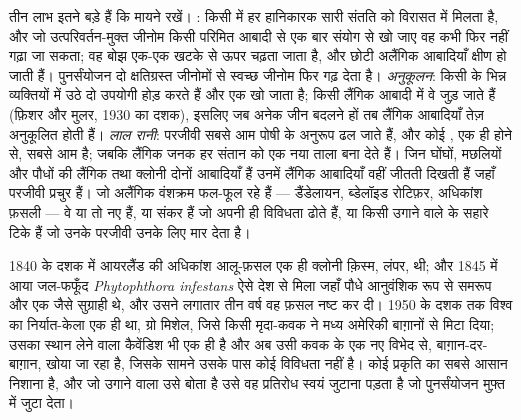 \begin{proposition}[लैंगिकता किसलिए है]\label{prop:b2:asexual-reproduction:whysex}
तीन लाभ इतने बड़े हैं कि मायने रखें। \emph{}:
किसी  में हर हानिकारक  सारी संतति को विरासत में मिलता
है, और जो उत्परिवर्तन-मुक्त जीनोम किसी परिमित आबादी से एक बार संयोग से
खो जाए वह कभी फिर नहीं गढ़ा जा सकता; वह बोझ एक-एक खटके से ऊपर चढ़ता जाता
है, और छोटी अलैंगिक आबादियाँ क्षीण हो जाती हैं। पुनर्संयोजन दो
क्षतिग्रस्त जीनोमों से स्वच्छ जीनोम फिर गढ़ देता है। \emph{अनुकूलन}: किसी
 के भिन्न व्यक्तियों में उठे दो उपयोगी  होड़ करते हैं और
एक खो जाता है; किसी लैंगिक आबादी में वे जुड़ जाते हैं (फ़िशर और मुलर,
1930 का दशक), इसलिए जब अनेक जीन बदलने हों तब लैंगिक आबादियाँ तेज़
अनुकूलित होती हैं। \emph{लाल रानी}: परजीवी सबसे आम पोषी
 के अनुरूप ढल जाते हैं, और कोई , एक ही  होने से,
सबसे आम है; जबकि लैंगिक जनक हर संतान को एक नया ताला बना देते हैं। जिन
घोंघों, मछलियों और पौधों की लैंगिक तथा क्लोनी दोनों आबादियाँ हैं उनमें
लैंगिक आबादियाँ वहीं जीतती दिखती हैं जहाँ परजीवी प्रचुर हैं। जो अलैंगिक
वंशक्रम फल-फूल रहे हैं --- डैंडेलायन, ब्डेलॉइड रोटिफ़र, अधिकांश फ़सली
 --- वे या तो नए हैं, या  संकर हैं जो अपनी ही
विविधता ढोते हैं, या किसी उगाने वाले के सहारे टिके हैं जो उनके परजीवी
उनके लिए मार देता है।
\end{proposition}

\begin{example}[किसी क्लोन के एकशस्य]\label{ex:b2:asexual-reproduction:monoculture}
1840 के दशक में आयरलैंड की अधिकांश आलू-फ़सल एक ही क्लोनी
क़िस्म, लंपर, थी; और 1845 में आया जल-फफूँद \emph{Phytophthora infestans}
ऐसे देश से मिला जहाँ पौधे आनुवंशिक रूप से समरूप और एक जैसे
सुग्राही थे, और उसने लगातार तीन वर्ष वह फ़सल नष्ट कर दी।
1950 के दशक तक विश्व का निर्यात-केला एक ही  था, ग्रो
मिशेल, जिसे किसी मृदा-कवक ने मध्य अमेरिकी बाग़ानों से मिटा दिया;
उसका स्थान लेने वाला कैवेंडिश भी एक ही  है और अब उसी कवक के एक नए
विभेद से, बाग़ान-दर-बाग़ान, खोया जा रहा है, जिसके सामने उसके पास कोई
विविधता नहीं है। कोई  प्रकृति का सबसे आसान निशाना है,
और जो उगाने वाला उसे बोता है उसे वह प्रतिरोध स्वयं जुटाना पड़ता है जो
पुनर्संयोजन मुफ़्त में जुटा देता।
\end{example}

